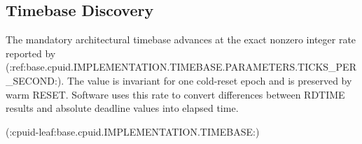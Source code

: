 \subsection{Timebase Discovery}
The mandatory architectural timebase advances at the exact nonzero integer rate reported by
(:ref:base.cpuid.IMPLEMENTATION.TIMEBASE.PARAMETERS.TICKS_PER_SECOND:). The value is invariant for one cold-reset epoch and is preserved by warm RESET.
Software uses this rate to convert differences between RDTIME results and absolute deadline values into elapsed time.

(:cpuid-leaf:base.cpuid.IMPLEMENTATION.TIMEBASE:)
